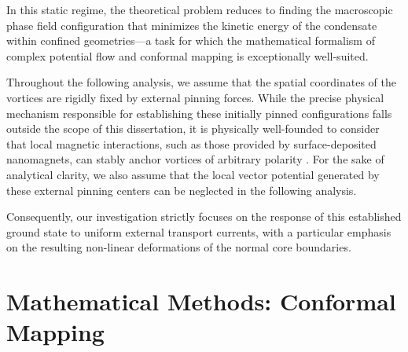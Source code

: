 \documentclass[english,binding=0.6cm,noexaminfo]{sapthesis}
\begin{document}
In this static regime, the theoretical problem reduces to finding the macroscopic phase field configuration that minimizes the kinetic energy of the condensate within confined geometries---a task for which the mathematical formalism of complex potential flow and conformal mapping is exceptionally well-suited. 

Throughout the following analysis, we assume that the spatial coordinates of the vortices are rigidly fixed by external pinning forces. While the precise physical mechanism responsible for establishing these initially pinned configurations falls outside the scope of this dissertation, it is physically well-founded to consider that local magnetic interactions, such as those provided by surface-deposited nanomagnets, can stably anchor vortices of arbitrary polarity \cite{martin1997artificial}. For the sake of analytical clarity, we also assume that the local vector potential generated by these external pinning centers can be neglected in the following analysis.

Consequently, our investigation strictly focuses on the response of this established ground state to uniform external transport currents, with a particular emphasis on the resulting non-linear deformations of the normal core boundaries.

\chapter{Mathematical Methods: Conformal Mapping}
\end{document}
